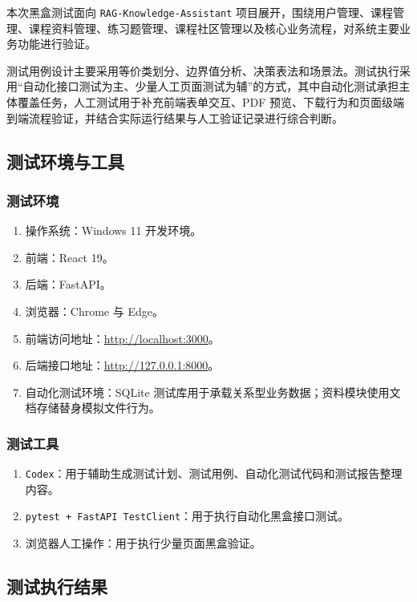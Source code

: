 \documentclass[12pt,a4paper]{ctexart}
\begin{document}
本次黑盒测试面向 \texttt{RAG-Knowledge-Assistant} 项目展开，围绕用户管理、课程管理、课程资料管理、练习题管理、课程社区管理以及核心业务流程，对系统主要业务功能进行验证。

测试用例设计主要采用等价类划分、边界值分析、决策表法和场景法。测试执行采用“自动化接口测试为主、少量人工页面测试为辅”的方式，其中自动化测试承担主体覆盖任务，人工测试用于补充前端表单交互、PDF 预览、下载行为和页面级端到端流程验证，并结合实际运行结果与人工验证记录进行综合判断。

\subsection{测试环境与工具}

\subsubsection{测试环境}

\begin{enumerate}
  \item 操作系统：Windows 11 开发环境。
  \item 前端：React 19。
  \item 后端：FastAPI。
  \item 浏览器：Chrome 与 Edge。
  \item 前端访问地址：\url{http://localhost:3000}。
  \item 后端接口地址：\url{http://127.0.0.1:8000}。
  \item 自动化测试环境：SQLite 测试库用于承载关系型业务数据；资料模块使用文档存储替身模拟文件行为。
\end{enumerate}

\subsubsection{测试工具}

\begin{enumerate}
  \item \texttt{Codex}：用于辅助生成测试计划、测试用例、自动化测试代码和测试报告整理内容。
  \item \texttt{pytest + FastAPI TestClient}：用于执行自动化黑盒接口测试。
  \item 浏览器人工操作：用于执行少量页面黑盒验证。
\end{enumerate}

\subsection{测试执行结果}
\end{document}
